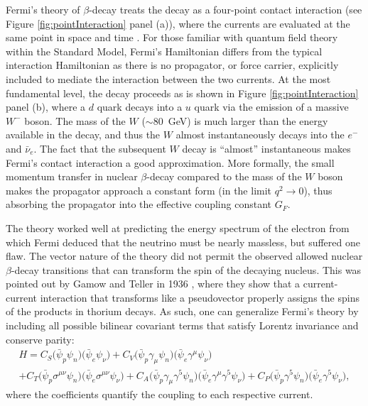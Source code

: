 Fermi's theory of $\beta$-decay treats the decay as a four-point contact interaction
(see Figure \ref{fig:pointInteraction} panel (a)), where
the currents are evaluated at the same point in space and time \cite{renton1990}. For those
familiar with quantum field theory within the Standard Model, Fermi's Hamiltonian differs from the typical
interaction Hamiltonian as there is no propagator, or force carrier, explicitly included to mediate the
interaction between the two currents. At the most fundamental level, the decay proceeds as is shown
in Figure \ref{fig:pointInteraction} panel (b), where a $d$ quark decays into a $u$ quark
via the emission of a massive $W^-$ boson. The mass of the $W$ ($\sim 80$~GeV) is much larger than
the energy available in the decay, and thus the $W$ almost instantaneously decays into
the $e^-$ and $\bar{\nu}_e$. The fact that the subsequent $W$ decay is ``almost'' instantaneous
makes Fermi's contact interaction a good approximation. More formally, the small momentum transfer in nuclear
$\beta$-decay compared to the mass of the $W$ boson makes the propagator approach a constant form
(in the limit $q^2\rightarrow 0$), thus absorbing
the propagator into the effective coupling constant $G_F$. 

The theory
worked well at predicting the energy spectrum of the electron from which
Fermi deduced that the neutrino must be nearly massless, but suffered one flaw. The vector
nature of the theory did not permit the observed allowed nuclear $\beta$-decay transitions
that can transform the spin of the decaying nucleus. This was pointed out by Gamow and Teller in
1936 \cite{gamow1936}, where they show that a current-current interaction that transforms like
a pseudovector properly assigns the spins of the products in thorium decays. As such,
one can generalize Fermi's theory by including all possible bilinear covariant terms that
satisfy Lorentz invariance and conserve parity:
%
\begin{multline}
  H = C_S\big( \bar{\psi}_p \psi_n \big) \big( \bar{\psi}_e  \psi_\nu \big) 
  +C_V\big( \bar{\psi}_p \gamma_\mu \psi_n \big) \big( \bar{\psi}_e \gamma^\mu \psi_\nu \big) \\
  +C_T\big( \bar{\psi}_p \sigma^{\mu\nu} \psi_n \big) \big( \bar{\psi}_e \sigma^{\mu\nu} \psi_\nu \big) 
  +C_A\big( \bar{\psi}_p \gamma_\mu \gamma^5 \psi_n \big) \big( \bar{\psi}_e \gamma^\mu \gamma^5 \psi_\nu \big) 
  +C_P\big( \bar{\psi}_p  \gamma^5 \psi_n \big) \big( \bar{\psi}_e  \gamma^5 \psi_\nu \big),
  \label{eq:FermiFull}
\end{multline}
%
where the coefficients quantify the coupling to each respective current.

